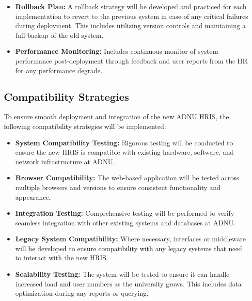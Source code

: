     \begin{itemize}
        \item[] \textbf{Rollback Plan:} A rollback strategy will be developed and practiced for each implementation to revert to the previous system in case of any critical failures during deployment. This includes utilizing version controls and maintaining a full backup of the old system.

        \item[] \textbf{Performance Monitoring:} Includes continuous monitor of system performance post-deployment through feedback and user reports from the HR for any performance degrade.
    \end{itemize}

    \subsection{Compatibility Strategies}
 
    To ensure smooth deployment and integration of the new ADNU HRIS, the following compatibility strategies will be implemented:
    
    \begin{itemize}
        \item[] \textbf{System Compatibility Testing:} Rigorous testing will be conducted to ensure the new HRIS is compatible with existing hardware, software, and network infrastructure at ADNU.
        
        \item[] \textbf{Browser Compatibility:} The web-based application will be tested across multiple browsers and versions to ensure consistent functionality and appearance.
        
        \item[] \textbf{Integration Testing:} Comprehensive testing will be performed to verify seamless integration with other existing systems and databases at ADNU.
        
        \item[] \textbf{Legacy System Compatibility:} Where necessary, interfaces or middleware will be developed to ensure compatibility with any legacy systems that need to interact with the new HRIS.
        
        \item[] \textbf{Scalability Testing:} The system will be tested to ensure it can handle increased load and user numbers as the university grows. This includes data optimization during any reports or querying. 
    \end{itemize}
    

